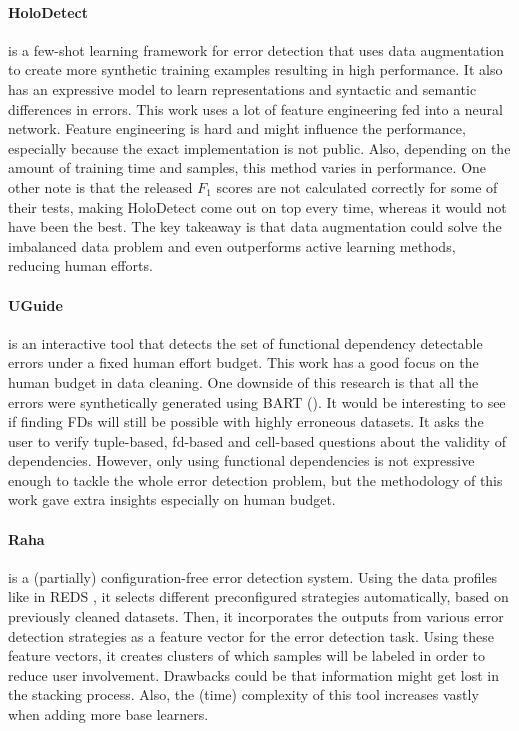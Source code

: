 \paragraph{HoloDetect \cite{Heidari2019-ox}} is a few-shot learning framework for error detection that uses data augmentation to create more synthetic training examples resulting in high performance. It also has an expressive model to learn representations and syntactic and semantic differences in errors. This work uses a lot of feature engineering fed into a neural network. Feature engineering is hard and might influence the performance, especially because the exact implementation is not public. Also, depending on the amount of training time and samples, this method varies in performance. One other note is that the released $F_1$ scores are not calculated correctly for some of their tests, making HoloDetect come out on top every time, whereas it would not have been the best. The key takeaway is that data augmentation could solve the imbalanced data problem and even outperforms active learning methods, reducing human efforts. 

\paragraph{UGuide \cite{Thirumuruganathan2017-ip}} is an interactive tool that detects the set of functional dependency detectable errors under a fixed human effort budget. This work has a good focus on the human budget in data cleaning. One downside of this research is that all the errors were synthetically generated using BART (\cite{Arocena2015-om}). It would be interesting to see if finding FDs will still be possible with highly erroneous datasets. It asks the user to verify tuple-based, fd-based and cell-based questions about the validity of dependencies. However, only using functional dependencies is not expressive enough to tackle the whole error detection problem, but the methodology of this work gave extra insights especially on human budget.


\paragraph{Raha \cite{Mahdavi2019-zf}} is a (partially) configuration-free error detection system. Using the data profiles like in REDS \cite{Mahdavi2019-pk}, it selects different preconfigured strategies automatically, based on previously cleaned datasets. Then, it incorporates the outputs from various error detection strategies as a feature vector for the error detection task. 
Using these feature vectors, it creates clusters of which samples will be labeled in order to reduce user involvement. Drawbacks could be that information might get lost in the stacking process. Also, the (time) complexity of this tool increases vastly when adding more base learners.

